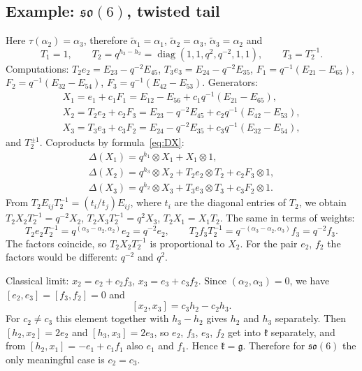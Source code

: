 \documentclass[12pt,a4paper]{article}
\newcommand{\g}{\mathfrak{g}}
\newcommand{\kk}{\mathfrak{k}}
\newcommand{\so}{\mathfrak{so}}
\newcommand{\ta}{\tilde\alpha}
\newcommand{\ot}{\otimes}
\newcommand{\diag}{\operatorname{diag}}
\begin{document}
\subsection{Example: $\so(6)$, twisted tail}\label{ss:so6}
Here $\tau(\alpha_2)=\alpha_3$, therefore $\ta_1=\alpha_1$, $\ta_2=\alpha_3$, $\ta_3=\alpha_2$ and
\[
T_1=1,\qquad T_2=q^{h_3-h_2}=\diag(1,1,q^2,q^{-2},1,1),\qquad T_3=T_2^{-1}.
\]
Computations: $T_2e_2=E_{23}-q^{-2}E_{45}$, $T_3e_3=E_{24}-q^{-2}E_{35}$,
$F_1=q^{-1}(E_{21}-E_{65})$, $F_2=q^{-1}(E_{32}-E_{54})$, $F_3=q^{-1}(E_{42}-E_{53})$. Generators:
\begin{gather*}
X_1=e_1+c_1F_1=E_{12}-E_{56}+c_1q^{-1}(E_{21}-E_{65}),\\
X_2=T_2e_2+c_2F_3=E_{23}-q^{-2}E_{45}+c_2q^{-1}(E_{42}-E_{53}),\\
X_3=T_3e_3+c_3F_2=E_{24}-q^{-2}E_{35}+c_3q^{-1}(E_{32}-E_{54}),
\end{gather*}
and $T_2^{\pm1}$. Coproducts by formula~\eqref{eq:DX}:
\begin{gather*}
\Delta(X_1)=q^{h_1}\ot X_1+X_1\ot1,\\
\Delta(X_2)=q^{h_3}\ot X_2+T_2e_2\ot T_2+c_2F_3\ot1,\\
\Delta(X_3)=q^{h_2}\ot X_3+T_3e_3\ot T_3+c_3F_2\ot1 .
\end{gather*}
From $T_2E_{ij}T_2^{-1}=(t_i/t_j)E_{ij}$, where $t_i$ are the diagonal entries of $T_2$, we obtain $T_2X_2T_2^{-1}=q^{-2}X_2$,
$T_2X_3T_2^{-1}=q^{2}X_3$, $T_2X_1=X_1T_2$.
The same in terms of weights:
\[
T_2e_2T_2^{-1}=q^{(\alpha_3-\alpha_2,\alpha_2)}e_2=q^{-2}e_2,\qquad
T_2f_3T_2^{-1}=q^{-(\alpha_3-\alpha_2,\alpha_3)}f_3=q^{-2}f_3 .
\]
The factors coincide, so $T_2X_2T_2^{-1}$ is proportional to $X_2$. For the pair $e_2$, $f_2$ the factors would be different:
$q^{-2}$ and $q^{2}$.

Classical limit: $x_2=e_2+c_2f_3$, $x_3=e_3+c_3f_2$. Since $(\alpha_2,\alpha_3)=0$, we have $[e_2,e_3]=[f_3,f_2]=0$ and
\begin{equation}\label{eq:so6br}
[x_2,x_3]=c_3h_2-c_2h_3 .
\end{equation}
For $c_2\neq c_3$ this element together with $h_3-h_2$ gives $h_2$ and $h_3$ separately. Then $[h_2,x_2]=2e_2$ and $[h_3,x_3]=2e_3$, so $e_2$, $f_3$, $e_3$, $f_2$ get into $\kk$ separately, and from $[h_2,x_1]=-e_1+c_1f_1$ also $e_1$ and $f_1$. Hence $\kk=\g$. Therefore for $\so(6)$ the only meaningful case is $c_2=c_3$.
\end{document}
